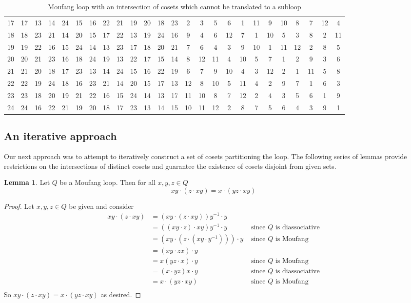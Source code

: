 \documentclass[12pt, twoside, openright]{report}
\theoremstyle{definition}
\newtheorem{lem}[thm]{Lemma}
\begin{document}
\begin{table}[H]
{\begin{tabular}{c | c c c c c c c c c c c c c c c c c c c c c c c c|}
    17& 17& 13& 14& 24& 15& 16& 22& 21& 19& 20& 18& 23&  2&  3&  5&  6&  1& 11&  9& 10&  8&  7& 12&  4 \\
    18& 18& 23& 21& 14& 20& 15& 17& 22& 13& 19& 24& 16&  9&  4&  6& 12&  7&  1& 10&  5&  3&  8&  2& 11 \\
    19& 19& 22& 16& 15& 24& 14& 13& 23& 17& 18& 20& 21&  7&  6&  4&  3&  9& 10&  1& 11& 12&  2&  8&  5 \\
    20& 20& 21& 23& 16& 18& 24& 19& 13& 22& 17& 15& 14&  8& 12& 11&  4& 10&  5&  7&  1&  2&  9&  3&  6 \\
    21& 21& 20& 18& 17& 23& 13& 14& 24& 15& 16& 22& 19&  6&  7&  9& 10&  4&  3& 12&  2&  1& 11&  5&  8 \\
    22& 22& 19& 24& 18& 16& 23& 21& 14& 20& 15& 17& 13& 12&  8& 10&  5& 11&  4&  2&  9&  7&  1&  6&  3 \\
    23& 23& 18& 20& 19& 21& 22& 16& 15& 24& 14& 13& 17& 11& 10&  8&  7& 12&  2&  4&  3&  5&  6&  1&  9 \\
    24& 24& 16& 22& 21& 19& 20& 18& 17& 23& 13& 14& 15& 10& 11& 12&  2&  8&  7&  5&  6&  4&  3&  9&  1 \\
    \hline
  \end{tabular}}
  \caption{Moufang loop with an intersection of cosets which cannot be translated to a subloop}
\end{table}

\subsection{An iterative approach}

Our next approach was to attempt to iteratively construct a set of cosets partitioning the loop. The
  following series of lemmas provide restrictions on the intersections of distinct cosets and guarantee
  the existence of cosets disjoint from given sets.

\begin{lem}\label{tech-cosets}
  Let $Q$ be a Moufang loop. Then for all $x, y, z\in Q$ 
  \[xy\cdot (z\cdot xy) = x\cdot (yz\cdot xy)\]
\end{lem}

\begin{proof}
  Let $x, y, z\in Q$ be given and consider
  \begin{align*}
    xy\cdot (z\cdot xy) &= (xy\cdot (z\cdot xy))y^{-1}\cdot y\\
    &= ((xy\cdot z)\cdot xy)y^{-1}\cdot y &\text{ since $Q$ is diassociative}\\
    &= (xy \cdot (z \cdot (xy \cdot y^{-1})))\cdot y &\text{ since $Q$ is Moufang}\\
    &= (xy \cdot zx)\cdot y\\
    &= x(yz\cdot x)\cdot y &\text{ since $Q$ is Moufang}\\
    &= (x\cdot yz)x\cdot y &\text{ since $Q$ is diassociative}\\
    &= x\cdot (yz\cdot xy) &\text{ since $Q$ is Moufang}\\
  \end{align*}
  So $xy\cdot(z\cdot xy) = x\cdot(yz\cdot xy)$ as desired.
\end{proof}
\end{document}

